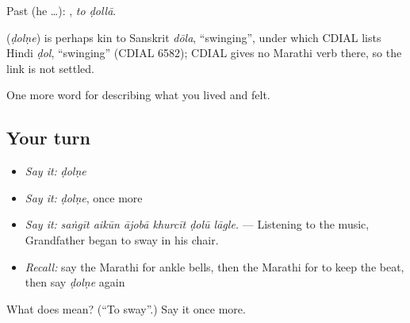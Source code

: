 Past (he …):  , \emph{to ḍollā}.

\begin{cousinweb}
\textbf{} (\emph{ḍolṇe}) is perhaps kin to Sanskrit \emph{dōla}, \textquotedblleft{}swinging\textquotedblright{}, under which CDIAL lists Hindi \emph{ḍol}, \textquotedblleft{}swinging\textquotedblright{} (CDIAL 6582); CDIAL gives no Marathi verb there, so the link is not settled.
\end{cousinweb}

\begin{grammarlens}[title={What you've built}]
One more word for describing what you lived and felt.
\end{grammarlens}

\subsection*{Your turn}
\begin{itemize}
\raggedright
  \item \emph{Say it:} \emph{ḍolṇe}
  \item \emph{Say it:} \emph{ḍolṇe}, once more
  \item \emph{Say it:} \emph{saṅgīt aikūn ājobā khurcīt ḍolū lāgle.} — Listening to the music, Grandfather began to sway in his chair.
  \item \emph{Recall:} say the Marathi for ankle bells, then the Marathi for to keep the beat, then say \emph{ḍolṇe} again
\end{itemize}

\begin{tcolorbox}[breakable,colback=teal!4,colframe=teal!35!black,title={Before you move on}]
What does  mean? (\textquotedblleft{}To sway\textquotedblright{}.) Say it once more.
\end{tcolorbox}
